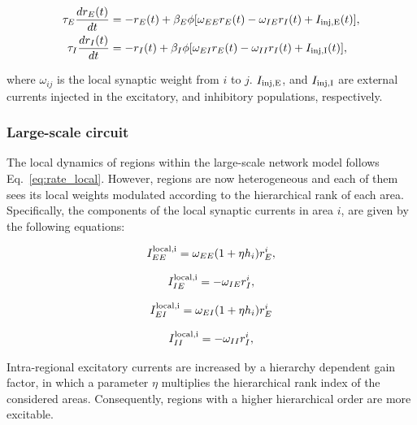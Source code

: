 \begin{equation}
    \begin{split}
            \tau_{E}\frac{dr_{E}(t)}{dt} &= -r_{E}(t) + \beta_{E}\phi[\omega_{EE}r_{E}(t) - \omega_{IE}r_{I}(t) + I_{\rm inj, E}(t)],\\
            \tau_{I}\frac{dr_{I}(t)}{dt} &= -r_{I}(t) + \beta_{I}\phi[\omega_{EI}r_{E}(t) - \omega_{II}r_{I}(t) + I_{\rm inj, I}(t)],
    \end{split}
    \label{eq:rate_local}
\end{equation}

\noindent where $\omega_{ij}$ is the local synaptic weight from $i$ to $j$. $I_{\rm inj, E}$, and $I_{\rm inj, I}$ are external currents injected in the excitatory, and inhibitory populations, respectively.

\subsubsection{Large-scale circuit}\label{lr_rate} The local dynamics of regions within the large-scale network model follows Eq.~\ref{eq:rate_local}. However, regions are now heterogeneous and each of them sees its local weights modulated according to the hierarchical rank of each area. Specifically, the components of the local synaptic currents in area $i$, are given by the following equations:

\begin{equation}
        I^{\rm local,i}_{EE} = \omega_{EE}(1+\eta h_{i})r_E^{i},
        \label{eq:local_ee}
\end{equation}

\begin{equation}
        I^{\rm local,i}_{IE} = -\omega_{IE}r_I^{i}
        \label{eq:local_ie},
\end{equation}

\begin{equation}
        I^{\rm local,i}_{EI} = \omega_{EI}(1+\eta h_{i})r_E^{i}
        \label{eq:local_ei}
\end{equation}

\begin{equation}
        I^{\rm local,i}_{II} = -\omega_{II}r_I^{i},
        \label{eq:local_ii}
\end{equation}

\noindent Intra-regional excitatory currents are  increased by a hierarchy dependent gain factor, in which a parameter $\eta$ multiplies the hierarchical rank index of the considered areas. Consequently, regions with a higher hierarchical order are more excitable.

